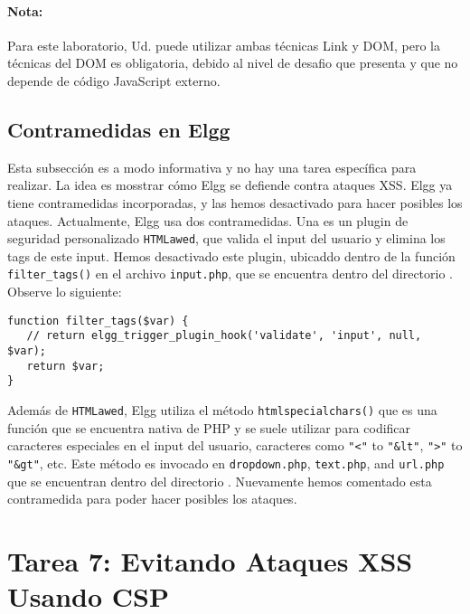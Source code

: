 \paragraph{Nota:} Para este laboratorio, Ud. puede utilizar ambas técnicas Link y DOM, pero la técnicas del DOM es obligatoria, debido al nivel de desafio que presenta y que no depende de código JavaScript externo.



\subsection{Contramedidas en Elgg}

Esta subsección es a modo informativa y no hay una tarea específica para realizar.
La idea es mosstrar cómo Elgg se defiende contra ataques XSS.
Elgg ya tiene contramedidas incorporadas, y
las hemos desactivado para hacer posibles los ataques. Actualmente, Elgg usa dos contramedidas.
Una es un plugin de seguridad personalizado \texttt{HTMLawed},
que valida el input del usuario y elimina los tags de este input.
Hemos desactivado este plugin, 
ubicaddo dentro de la función \texttt{filter\_tags()}
en el archivo \texttt{input.php}, que se encuentra dentro del directorio
. Observe lo siguiente:

\begin{lstlisting}
function filter_tags($var) {
   // return elgg_trigger_plugin_hook('validate', 'input', null, $var);
   return $var;
}
\end{lstlisting}
 
Además de {\tt HTMLawed}, Elgg utiliza el método \texttt{htmlspecialchars()} que es una función que se encuentra nativa de PHP y se suele utilizar para codificar caracteres especiales en el input del usuario, caracteres como {\tt "<"} to {\tt "\&lt"}, {\tt ">"} to {\tt "\&gt"}, etc.
Este método es invocado en \texttt{dropdown.php}, \texttt{text.php}, 
and \texttt{url.php} que se encuentran dentro del directorio .
Nuevamente hemos comentado esta contramedida para poder hacer posibles los ataques.

\section{Tarea 7: Evitando Ataques XSS Usando CSP}

